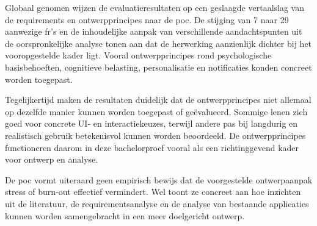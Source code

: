 Globaal genomen wijzen de evaluatieresultaten op een geslaagde vertaalslag van de requirements en ontwerpprincipes naar de \acrshort{poc}. De stijging van 7 naar 29 aanwezige \acrshort{fr}'s en de inhoudelijke aanpak van verschillende aandachtspunten uit de oorspronkelijke analyse tonen aan dat de herwerking aanzienlijk dichter bij het vooropgestelde kader ligt. Vooral ontwerpprincipes rond psychologische basisbehoeften, cognitieve belasting, personalisatie en notificaties konden concreet worden toegepast.

\vspace{1em}

Tegelijkertijd maken de resultaten duidelijk dat de ontwerpprincipes niet allemaal op dezelfde manier kunnen worden toegepast of geëvalueerd. Sommige lenen zich goed voor concrete UI- en interactiekeuzes, terwijl andere pas bij langdurig en realistisch gebruik betekenisvol kunnen worden beoordeeld. De ontwerpprincipes functioneren daarom in deze bachelorproef vooral als een richtinggevend kader voor ontwerp en analyse.

\vspace{1em}

De \acrshort{poc} vormt uiteraard geen empirisch bewijs dat de voorgestelde ontwerpaanpak stress of burn-out effectief vermindert. Wel toont ze concreet aan hoe inzichten uit de literatuur, de requirementsanalyse en de analyse van bestaande applicaties kunnen worden samengebracht in een meer doelgericht ontwerp.